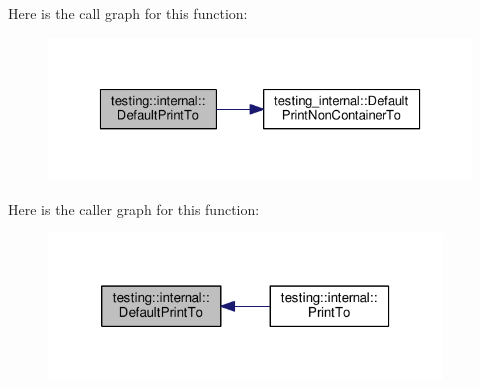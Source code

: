 Here is the call graph for this function\-:\nopagebreak
\begin{figure}[H]
\begin{center}
\leavevmode
\includegraphics[width=326pt]{namespacetesting_1_1internal_a29e705ab252af57e825a086bb49c4831_cgraph}
\end{center}
\end{figure}




Here is the caller graph for this function\-:\nopagebreak
\begin{figure}[H]
\begin{center}
\leavevmode
\includegraphics[width=296pt]{namespacetesting_1_1internal_a29e705ab252af57e825a086bb49c4831_icgraph}
\end{center}
\end{figure}


